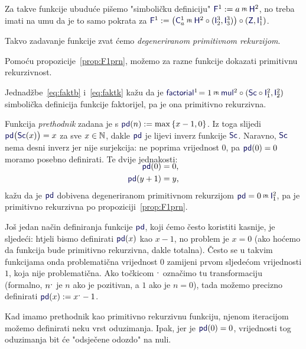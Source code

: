 \begin{definicija}\label{def:F1prn}
Za takve funkcije ubuduće pišemo "simboličku definiciju" $\f F^1:=a\pr\f H^2$, no treba imati na umu da je to samo pokrata za $\f F^1:=\bigl(\f C_a^1\pr\f H^2\circ(\f I_2^3,\f I_3^3)\bigr)\circ(\f Z,\f I_1^1)$.

Takvo zadavanje funkcije zvat ćemo \emph{degeneriranom primitivnom rekurzijom}.
\end{definicija}

Pomoću propozicije~\ref{prop:F1prn}, možemo za razne funkcije dokazati primitivnu rekurzivnost.%

\begin{primjer}\label{pr:factorialprn}
Jednadžbe~\eqref{eq:faktb} i~\eqref{eq:faktk} kažu da je $\f{factorial}^1\!=1\pr\f{mul}^2\circ(\f{Sc}\circ\f I_1^2,\f I_2^2)$ simbolička definicija funkcije faktorijel, pa je ona primitivno rekurzivna.
\end{primjer}

\begin{primjer}
Funkcija \emph{prethodnik} zadana je s $\f{pd}(n):=\max\,\{x-1,0\}$. Iz toga slijedi $\f{pd}\bigl(\f{Sc}(x)\bigr)=x$ za sve $x\in{\mathbb N}$, dakle $\f{pd}$ je lijevi inverz funkcije $\f{Sc}$. Naravno, $\f{Sc}$ nema desni inverz jer nije surjekcija: ne poprima vrijednost $0$, pa $\f{pd}(0)=0$ moramo posebno definirati. Te dvije jednakosti:
\begin{align}
\SwapAboveDisplaySkip
    \f{pd}(0)&=0\text,\\
    \f{pd}(y+1)&=y\text,
\end{align}
kažu da je $\f{pd}$ dobivena degeneriranom primitivnom rekurzijom $\f{pd}=0\pr\f I_1^2$, pa je primitivno rekurzivna po propoziciji~\ref{prop:F1prn}.
\end{primjer}

\begin{napomena}\label{nap:crtica}
Još jedan način definiranja funkcije $\f{pd}$, koji ćemo često koristiti kasnije, je sljedeći: htjeli bismo definirati $\f{pd}(x)$ kao $x-1$, no problem je $x=0$ (ako hoćemo da funkcija bude primitivno rekurzivna, dakle totalna). Često se u takvim funkcijama onda problematična vrijednost $0$ zamijeni prvom sljedećom vrijednosti $1$, koja nije problematična. Ako točkicom $\sp{\text{\normalsize.}}$ označimo tu transformaciju (formalno, $n\sp{\text{\normalsize.}}$ je $n$ ako je pozitivan, a $1$ ako je $n=0$), tada možemo precizno definirati $\f{pd}(x):=x\bump-1$.
\end{napomena}

Kad imamo prethodnik kao primitivno rekurzivnu funkciju, njenom iteracijom mo\-že\-mo definirati neku vrst oduzimanja. Ipak, jer je $\f{pd}(0)=0$, vrijednosti tog oduzimanja bit će "odsječene odozdo" na nuli.

